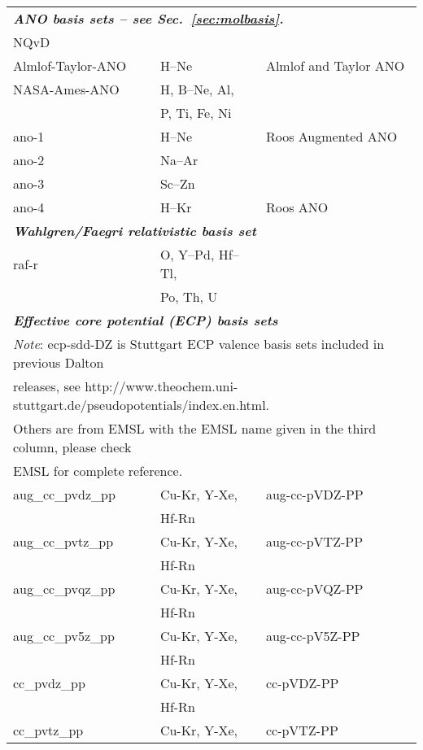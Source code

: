 \begin{longtable}{lll}
\hline
\multicolumn{3}{l}{\bf{\emph{ANO basis sets\index{basis!ANO} -- see Sec.~\ref{sec:molbasis}.}}} \\
NQvD & & \cite{nqvdref} \\
Almlof-Taylor-ANO & H--Ne & \cite{japrtjcp86} Almlof and Taylor ANO \\
NASA-Ames-ANO & H, B--Ne, Al, & \cite{japrtjcp86,cwbsrlaktca77} \\
  & P, Ti, Fe, Ni & \\
ano-1 & H--Ne & \cite{powpambortca77} Roos Augmented ANO\\
ano-2 & Na--Ar & \cite{powbjpbortca79} \\
ano-3 & Sc--Zn & \cite{rpamminpowbortca92} \\
ano-4 & H--Kr & \cite{kpbdpowbortca90} Roos ANO\\
\hline
\multicolumn{3}{l}{\bf{\emph{Wahlgren/Faegri relativistic basis set}}} \\
raf-r & O, Y--Pd, Hf--Tl, & \\
 & Po, Th, U & \\
\hline
\multicolumn{3}{l}{\bf{\emph{Effective core potential (ECP) basis sets}}} \\
\multicolumn{3}{l}{\emph{Note}: ecp-sdd-DZ is Stuttgart ECP valence basis sets included in previous Dalton}\\
\multicolumn{3}{l}{ releases, see http://www.theochem.uni-stuttgart.de/pseudopotentials/index.en.html.}\\
\multicolumn{3}{l}{Others are from EMSL with the EMSL name given in the third column, please check}\\
\multicolumn{3}{l}{EMSL for complete reference.}\\
aug\_cc\_pvdz\_pp & Cu-Kr, Y-Xe, & aug-cc-pVDZ-PP\\
                  & Hf-Rn &\\
aug\_cc\_pvtz\_pp & Cu-Kr, Y-Xe, & aug-cc-pVTZ-PP\\
                  & Hf-Rn &\\
aug\_cc\_pvqz\_pp & Cu-Kr, Y-Xe, & aug-cc-pVQZ-PP\\
                  & Hf-Rn &\\
aug\_cc\_pv5z\_pp & Cu-Kr, Y-Xe, & aug-cc-pV5Z-PP\\
                  & Hf-Rn &\\
cc\_pvdz\_pp & Cu-Kr, Y-Xe, & cc-pVDZ-PP\\
             & Hf-Rn &\\
cc\_pvtz\_pp & Cu-Kr, Y-Xe, & cc-pVTZ-PP\\

\end{longtable}

